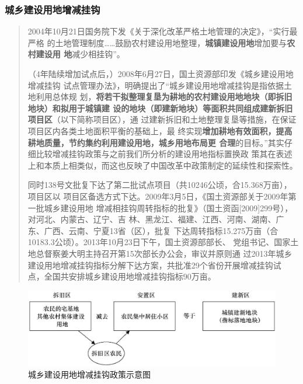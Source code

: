 
\subsubsection{城乡建设用地增减挂钩}

\begin{quotation}
  2004年10月21日国务院下发《关于深化改革严格土地管理的决定》，“实行最严格
  的土地管理制度……鼓励农村建设用地整理，\textbf{城镇建设用地}增加要与\textbf{农村建设用
    地}减少相挂钩”。

  （4年陆续增加试点后，）2008年6月27日，国土资源部印发《城乡建设用地增减挂钩
  试点管理办法》，明确提出了“城乡建设用地增减挂钩是指依据土地利用总体规
  划，\textbf{将若干拟整理复垦为耕地的农村建设用地地块（即拆旧地块）和拟用于城镇建
    设的地块（即建新地块）等面积共同组成建新拆旧项目区}（以下简称项目区），通
  过建新拆旧和土地整理复垦等措施，在保证项目区内各类土地面积平衡的基础上，最
  终实现\textbf{增加耕地有效面积，提高耕地质量，节约集约利用建设用地，城乡用地布局更
  合理}的目标。”其实仔细比较增减挂钩政策与之前我们所分析的建设用地指标置换政
  策其在表述上和本质上相类似，而这也反映了中国改革中政策制定的延续性和探索性。

  同时138号文批复下达了第二批试点项目（共10246公顷，合15.368万亩），项目区以
  项目区备选方式下达。2009年3月5日，《国土资源部关于2009年第一批城乡建设用地
  增减相挂钩周转指标的批复》（国土资函[2009]299号），对河北、内蒙古、辽宁、吉
  林、黑龙江、福建、江西、河南、湖南、广东、广西、云南、宁夏13省（区），批复
  下达周转指标15.275万亩（合10183.3公顷）。2013年10月23日下午，国土资源部部长、
  党组书记、国家土地总督察姜大明主持召开第15次部长办公会，审议并原则通
  过2013年城乡建设用地增减挂钩指标分解下达方案，共批准29个省份开展增减挂钩试
  点，全国共安排城乡建设用地增减挂钩指标90万亩。\cite{yangdi}
\end{quotation}

\begin{figure}[htbp!]
  \centering
  \includegraphics[width=0.9\linewidth]{figures/zengjianguagou.jpg}
  \caption{\label{fig:zengjianguagou}城乡建设用地增减挂钩政策示意图}
\end{figure}

